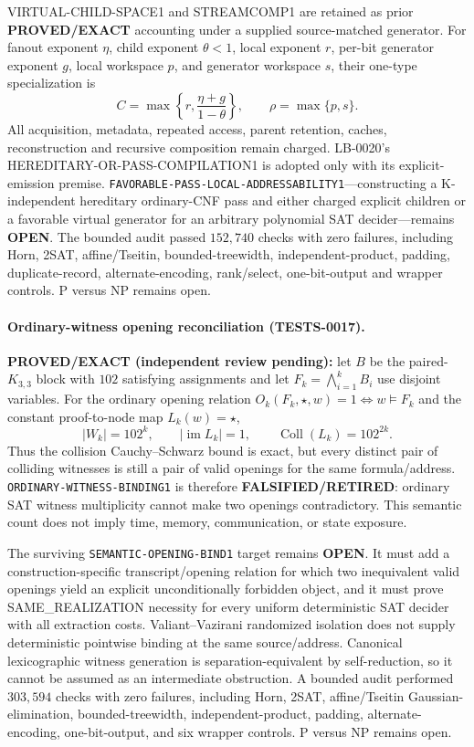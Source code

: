 \documentclass[11pt]{article}
\begin{document}
VIRTUAL-CHILD-SPACE1 and STREAMCOMP1 are retained as prior
\textbf{PROVED/EXACT} accounting under a supplied source-matched generator.
For fanout exponent \(\eta\), child exponent \(\theta<1\), local exponent
\(r\), per-bit generator exponent \(g\), local workspace \(p\), and generator
workspace \(s\), their one-type specialization is
\[
 C=\max\left\{r,\frac{\eta+g}{1-\theta}\right\},\qquad
 \rho=\max\{p,s\}.
\]
All acquisition, metadata, repeated access, parent retention, caches,
reconstruction and recursive composition remain charged.  LB-0020's
HEREDITARY-OR-PASS-COMPILATION1 is adopted only with its explicit-emission
premise.  \texttt{FAVORABLE-PASS-LOCAL-ADDRESSABILITY1}---constructing a
K-independent hereditary ordinary-CNF pass and either charged explicit
children or a favorable virtual generator for an arbitrary polynomial SAT
decider---remains \textbf{OPEN}.  The bounded audit passed \(152{,}740\)
checks with zero failures, including Horn, 2SAT, affine/Tseitin,
bounded-treewidth, independent-product, padding, duplicate-record,
alternate-encoding, rank/select, one-bit-output and wrapper controls.
P versus NP remains open.



\paragraph{Ordinary-witness opening reconciliation (TESTS-0017).}
\textbf{PROVED/EXACT (independent review pending):} let \(B\) be the
paired-\(K_{3,3}\) block with \(102\) satisfying assignments and let
\(F_k=\bigwedge_{i=1}^k B_i\) use disjoint variables.  For the ordinary
opening relation \(O_k(F_k,\star,w)=1\iff w\models F_k\) and the constant
proof-to-node map \(L_k(w)=\star\),
\[
 |W_k|=102^k,\qquad |\operatorname{im}L_k|=1,\qquad
 \operatorname{Coll}(L_k)=102^{2k}.
\]
Thus the collision Cauchy--Schwarz bound is exact, but every distinct pair of
colliding witnesses is still a pair of valid openings for the same
formula/address.  \texttt{ORDINARY-WITNESS-BINDING1} is therefore
\textbf{FALSIFIED/RETIRED}: ordinary SAT witness multiplicity cannot make two
openings contradictory.  This semantic count does not imply time, memory,
communication, or state exposure.

The surviving \texttt{SEMANTIC-OPENING-BIND1} target remains \textbf{OPEN}.
It must add a construction-specific transcript/opening relation for which two
inequivalent valid openings yield an explicit unconditionally forbidden
object, and it must prove SAME\_REALIZATION necessity for every uniform
deterministic SAT decider with all extraction costs.  Valiant--Vazirani
randomized isolation does not supply deterministic pointwise binding at the
same source/address.  Canonical lexicographic witness generation is
separation-equivalent by self-reduction, so it cannot be assumed as an
intermediate obstruction.  A bounded audit performed \(303{,}594\) checks
with zero failures, including Horn, 2SAT, affine/Tseitin Gaussian-elimination,
bounded-treewidth, independent-product, padding, alternate-encoding,
one-bit-output, and six wrapper controls.  P versus NP remains open.
\end{document}
